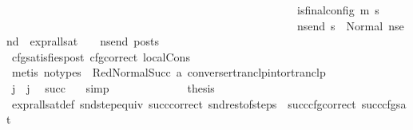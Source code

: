 \begin{isabellebody}
\ \ \ \ \ \ \ \ \ \ \ \ \ \ \ \ \ \ \ \ \ \ \ \ \ \ \ \ \ \ \ \ \ \ \ \ \ \ \ \ \ \ \ \ \ \ \ \ \ \ \ \ is{\isacharunderscore}{\kern0pt}final{\isacharunderscore}{\kern0pt}config\ {\isacharparenleft}{\kern0pt}m{\isacharprime}{\kern0pt}{\isacharcomma}{\kern0pt}\ s{\isacharprime}{\kern0pt}{\isacharparenright}{\kern0pt}\ {\isasymlongrightarrow}\ \isanewline
\ \ \ \ \ \ \ \ \ \ \ \ \ \ \ \ \ \ \ \ \ \ \ \ \ \ \ \ \ \ \ \ \ \ \ \ \ \ \ \ \ \ \ \ \ \ \ \ \ \ \ \ {\isacharparenleft}{\kern0pt}{\isasymforall}ns{\isacharunderscore}{\kern0pt}end{\isachardot}{\kern0pt}\ s{\isacharprime}{\kern0pt}\ {\isacharequal}{\kern0pt}\ Normal\ ns{\isacharunderscore}{\kern0pt}end\ {\isasymlongrightarrow}\ expr{\isacharunderscore}{\kern0pt}all{\isacharunderscore}{\kern0pt}sat\ {\isasymLambda}\ {\isasymGamma}\ {\isasymOmega}\ ns{\isacharunderscore}{\kern0pt}end\ posts{\isacharparenright}{\kern0pt}{\isacharparenright}{\kern0pt}{\isacharparenright}{\kern0pt}{\isacharparenright}{\kern0pt}{\isachardoublequoteclose}\isanewline
\ \ \ \ \ \ \ \ \ \ \ \ \isamarkupfalse%
\ cfg{\isacharunderscore}{\kern0pt}satisfies{\isacharunderscore}{\kern0pt}post\ cfg{\isacharunderscore}{\kern0pt}correct\ local{\isachardot}{\kern0pt}Cons\isanewline
\ \ \ \ \ \ \ \ \ \ \ \ \isamarkupfalse%
\ {\isacharparenleft}{\kern0pt}metis\ {\isacharparenleft}{\kern0pt}no{\isacharunderscore}{\kern0pt}types{\isacharparenright}{\kern0pt}\ {\isachardoublequoteopen}{}{\isachardoublequoteclose}\ RedNormalSucc\ a{}\ converse{\isacharunderscore}{\kern0pt}rtranclp{\isacharunderscore}{\kern0pt}into{\isacharunderscore}{\kern0pt}rtranclp{\isacharparenright}{\kern0pt}\isanewline
\isanewline
\ \ \ \ \ \ \ \ \ \ \isamarkupfalse%
\ {\isachardoublequoteopen}j{\isacharprime}{\kern0pt}{\isacharprime}{\kern0pt}\ {\isacharless}{\kern0pt}\ j{\isachardoublequoteclose}\ \isamarkupfalse%
\ succ{\isacharunderscore}{\kern0pt}{}\ {}\ \isamarkupfalse%
\ simp\isanewline
\isanewline
\ \ \ \ \ \ \ \ \ \ \isamarkupfalse%
\ \isamarkupfalse%
\ {\isacharquery}{\kern0pt}thesis\ \isamarkupfalse%
\ expr{\isacharunderscore}{\kern0pt}all{\isacharunderscore}{\kern0pt}sat{\isacharunderscore}{\kern0pt}def\ snd{\isacharunderscore}{\kern0pt}step{\isacharunderscore}{\kern0pt}equiv\ succ{\isacharunderscore}{\kern0pt}correct\ snd{\isacharunderscore}{\kern0pt}rest{\isacharunderscore}{\kern0pt}of{\isacharunderscore}{\kern0pt}steps\ {\isachardoublequoteopen}{}{\isachardoublequoteclose}\ succ{\isacharunderscore}{\kern0pt}cfg{\isacharunderscore}{\kern0pt}correct\ succ{\isacharunderscore}{\kern0pt}cfg{\isacharunderscore}{\kern0pt}sat\ \isamarkupfalse%

\end{isabellebody}
